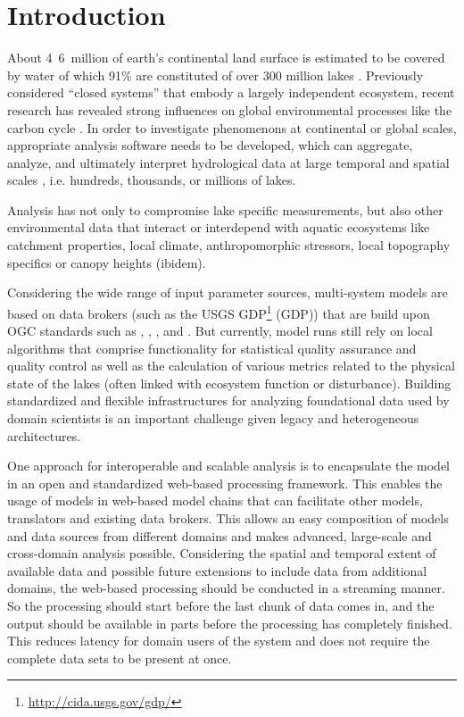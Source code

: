 
\chapter{Introduction}

About \unit{4.6 million}{\kilo\square\metre} of earth's continental land surface is estimated to be covered by water of which 91\% are constituted of over 300 million lakes \citep{downing2006global}. Previously considered ``closed systems'' that embody a largely independent ecosystem, recent research has revealed strong influences on global environmental processes like the carbon cycle \citep{cole2007plumbing}. In order to investigate phenomenons at continental or global scales, appropriate analysis software needs to be developed, which can aggregate, analyze, and ultimately interpret hydrological data at large temporal and spatial scales \citep{read2013upscaling}, i.e. hundreds, thousands, or millions of lakes.

Analysis has not only to compromise lake specific measurements, but also other environmental data that interact or interdepend with aquatic ecosystems like catchment properties, local climate, anthropomorphic stressors, local topography specifics or canopy heights (ibidem).

Considering the wide range of input parameter sources, multi-system models are based on data brokers (such as the \ac{USGS} \acl{GDP}\footnote{\url{http://cida.usgs.gov/gdp/} \lastretrievedp} (\acs{GDP})) that are build upon \ac{OGC} standards such as , , ,  and . But currently, model runs still rely on local algorithms that comprise functionality for statistical quality assurance and quality control as well as the calculation of various metrics related to the physical state of the lakes (often linked with ecosystem function or disturbance). Building standardized and flexible infrastructures for analyzing foundational data used by domain scientists is an important challenge given legacy and heterogeneous architectures.

One approach for interoperable and scalable analysis is to encapsulate the model in an open and standardized web-based processing framework. This enables the usage of models in web-based model chains that can facilitate other models, translators and existing data brokers. This allows an easy composition of models and data sources from different domains and makes advanced, large-scale and cross-domain analysis possible. Considering the spatial and temporal extent of available data and possible future extensions to include data from additional domains, the web-based processing should be conducted in a streaming manner. So the processing should start before the last chunk of data comes in, and the output should be available in parts before the processing has completely finished. This reduces latency for domain users of the system and does not require the complete data sets to be present at once.


